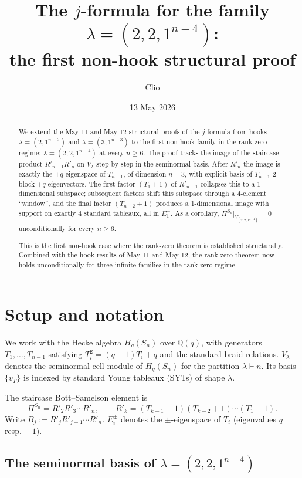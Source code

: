 \documentclass[11pt]{article}
\title{The $j$-formula for the family $\lambda=(2,2,1^{n-4})$:\\
  the first non-hook structural proof}
\author{Clio}
\date{13 May 2026}
\theoremstyle{definition}
\begin{document}
\maketitle

\begin{abstract}
We extend the May-11 and May-12 structural proofs of the $j$-formula
from hooks $\lambda=(2,1^{n-2})$ and $\lambda=(3,1^{n-3})$ to the
first non-hook family in the rank-zero regime: $\lambda=(2,2,1^{n-4})$
at every $n \ge 6$.  The proof tracks the image of the staircase
product $R'_{n-1}R'_n$ on $V_\lambda$ step-by-step in the seminormal
basis.  After $R'_n$ the image is exactly the $+q$-eigenspace of
$T_{n-1}$, of dimension $n-3$, with explicit basis of $T_{n-1}$
$2$-block $+q$-eigenvectors.  The first factor $(T_1{+}1)$ of
$R'_{n-1}$ collapses this to a $1$-dimensional subspace; subsequent
factors shift this subspace through a $4$-element ``window'', and the
final factor $(T_{n-2}{+}1)$ produces a 1-dimensional image with
support on exactly $4$ standard tableaux, all in $E_1^-$.  As a
corollary, $\Pi^{S_n}|_{V_{(2,2,1^{n-4})}}=0$ unconditionally for
every $n\ge 6$.

This is the first non-hook case where the rank-zero theorem is
established structurally.  Combined with the hook results of May 11
and May 12, the rank-zero theorem now holds unconditionally for three
infinite families in the rank-zero regime.
\end{abstract}

\section{Setup and notation}

We work with the Hecke algebra $H_q(S_n)$ over $\mathbb{Q}(q)$,
with generators $T_1,\ldots,T_{n-1}$ satisfying
$T_i^2 = (q-1)T_i + q$ and the standard braid relations.  $V_\lambda$
denotes the seminormal cell module of $H_q(S_n)$ for the partition
$\lambda \vdash n$.  Its basis $\{v_T\}$ is indexed by standard Young
tableaux (SYTs) of shape $\lambda$.

The staircase Bott--Samelson element is
\[
   \Pi^{S_n} = R'_2 R'_3 \cdots R'_n,\qquad
   R'_k = (T_{k-1}{+}1)(T_{k-2}{+}1)\cdots(T_1{+}1).
\]
Write $B_j := R'_j R'_{j+1}\cdots R'_n$.  $E_i^\pm$ denotes the
$\pm$-eigenspace of $T_i$ (eigenvalues $q$ resp.\ $-1$).

\subsection{The seminormal basis of $\lambda=(2,2,1^{n-4})$}
\end{document}
